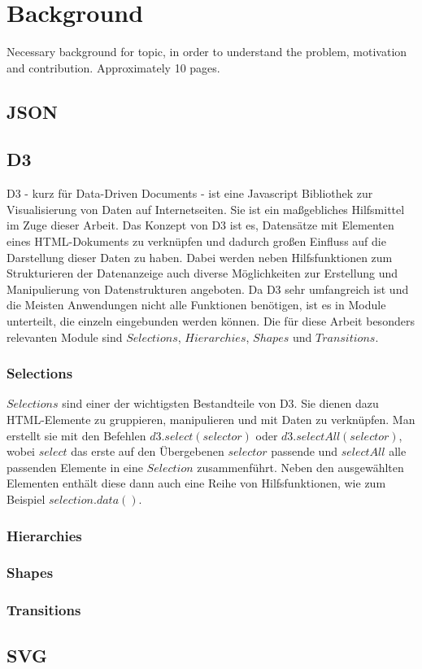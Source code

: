 \chapter{Background}
Necessary background for topic, in order to understand the problem, motivation and contribution. Approximately 10 pages.
\section{JSON}

\section{D3}\label{sec:framework}
D3 - kurz für Data-Driven Documents - ist eine Javascript Bibliothek zur Visualisierung von Daten auf Internetseiten. Sie ist ein maßgebliches Hilfsmittel im Zuge dieser Arbeit. Das Konzept von D3 ist es, Datensätze mit Elementen eines HTML-Dokuments zu verknüpfen und dadurch großen Einfluss auf die Darstellung dieser Daten zu haben. Dabei werden neben Hilfsfunktionen zum Strukturieren der Datenanzeige auch diverse Möglichkeiten zur Erstellung und Manipulierung von Datenstrukturen angeboten. Da D3 sehr umfangreich ist und die Meisten Anwendungen nicht alle Funktionen benötigen, ist es in Module unterteilt, die einzeln eingebunden werden können. Die für diese Arbeit besonders relevanten Module sind $Selections$, $Hierarchies$, $Shapes$ und $Transitions$.

\subsection{Selections}
$Selections$ sind einer der wichtigsten Bestandteile von D3. Sie dienen dazu HTML-Elemente zu gruppieren, manipulieren und mit Daten zu verknüpfen. Man erstellt sie mit den Befehlen $d3.select(selector)$ oder $d3.selectAll(selector)$, wobei $select$ das erste auf den Übergebenen $selector$ passende und $selectAll$ alle passenden Elemente in eine $Selection$ zusammenführt. Neben den ausgewählten Elementen enthält diese dann auch eine Reihe von Hilfsfunktionen, wie zum Beispiel $selection.data()$.  
\subsection{Hierarchies}
\subsection{Shapes}
\subsection{Transitions}
\section{SVG}
